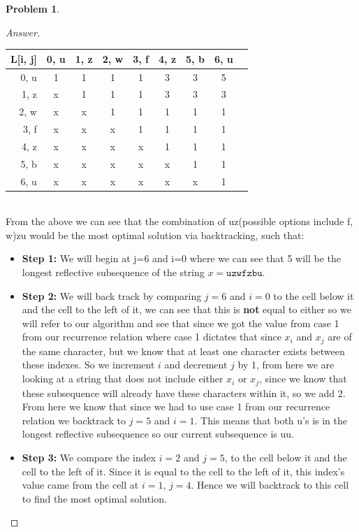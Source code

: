 \documentclass[11pt]{article}
\theoremstyle{definition}
\theoremstyle{definition}
\newtheorem{required}{Problem}
\theoremstyle{definition}
\begin{document}
\begin{required}
\begin{enumerate}[label=(\alph*)]
\begin{proof}[Answer]
\begin{tabular}{|r|c|c|c|c|c|c|c|c|}
\hline
L[i, j]& 0, u& 1, z& 2, w& 3, f& 4, z& 5, b& 6, u \\ 
 \hline
0, u & 1 & 1 & 1 & 1 & 3 & 3 & 5  \\ 
\hline
1, z& x& 1 & 1 & 1 & 3 & 3 & 3   \\ 
\hline
2, w & x & x & 1 & 1 & 1 & 1 & 1   \\ 
\hline
3, f& x & x & x & 1 & 1 & 1 & 1   \\ 
\hline
4, z& x & x & x & x & 1 & 1 & 1   \\ 
\hline
5, b& x & x & x & x & x & 1 & 1   \\ 
\hline
6, u& x & x & x & x & x & x & 1   \\ 
\hline
\end{tabular} \\

From the above we can see that the combination of uz(possible options include f, w)zu would be the most optimal solution via backtracking, such that: \\
\begin {itemize}
\item \textbf{Step 1:} We will begin at j=6 and i=0 where we can see that 5 will be the longest reflective subsequence of the string $x = \texttt{uzwfzbu} $. \\

\item \textbf{Step 2:} We will back track by comparing $j = 6$ and $i = 0$ to the cell below it and the cell to the left of it, we can see that this is \textbf{not} equal to either so we will refer to our algorithm and see that since we got the value from case 1 from our recurrence relation where case 1 dictates that since $x_i$ and $x_j$ are of the same character, but we know that at least one character exists between these indexes. So we increment $i$ and decrement $j$ by 1, from here we are looking at a string that does not include either $x_i$ or $x_j$, since we know that these subsequence will already have these characters within it, so we add 2. From here we know that since we had to use case 1 from our recurrence relation we backtrack to $j = 5$ and $i = 1$. This means that both u's is in the longest reflective subsequence so our current subsequence is uu.\\

\item \textbf{Step 3:} We compare the index  $i = 2$ and $j = 5$, to the cell below it and the cell to the left of it. Since it is equal to the cell to the left of it, this index's value came from the cell at $i=1$, $j=4$. Hence we will backtrack to this cell to find the most optimal solution. \\


\end{itemize}
\end{proof}
\end{enumerate}
\end{required}
\end{document}
